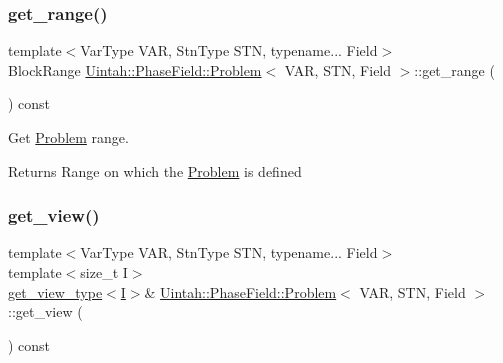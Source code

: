 \subsubsection{\texorpdfstring{get\+\_\+range()}{get\_range()}}
{\footnotesize\ttfamily template$<$Var\+Type V\+AR, Stn\+Type S\+TN, typename... Field$>$ \\
Block\+Range \hyperlink{classUintah_1_1PhaseField_1_1Problem}{Uintah\+::\+Phase\+Field\+::\+Problem}$<$ V\+AR, S\+TN, Field $>$\+::get\+\_\+range (\begin{DoxyParamCaption}{ }\end{DoxyParamCaption}) const\hspace{0.3cm}{\ttfamily [inline]}}



Get \hyperlink{classUintah_1_1PhaseField_1_1Problem}{Problem} range. 

\begin{DoxyReturn}{Returns}
Range on which the \hyperlink{classUintah_1_1PhaseField_1_1Problem}{Problem} is defined 
\end{DoxyReturn}
\mbox{\label{classUintah_1_1PhaseField_1_1Problem_ae68b96eca7d1f30b9cac99498a110de1}} 
\subsubsection{\texorpdfstring{get\+\_\+view()}{get\_view()}\hspace{0.1cm}{\footnotesize\ttfamily [1/4]}}
{\footnotesize\ttfamily template$<$Var\+Type V\+AR, Stn\+Type S\+TN, typename... Field$>$ \\
template$<$size\+\_\+t I$>$ \\
\hyperlink{classUintah_1_1PhaseField_1_1Problem_a53d941e785f501dddb8c369644eae4fa}{get\+\_\+view\+\_\+type}$<$\hyperlink{structUintah_1_1PhaseField_1_1I}{I}$>$\& \hyperlink{classUintah_1_1PhaseField_1_1Problem}{Uintah\+::\+Phase\+Field\+::\+Problem}$<$ V\+AR, S\+TN, Field $>$\+::get\+\_\+view (\begin{DoxyParamCaption}{ }\end{DoxyParamCaption}) const\hspace{0.3cm}{\ttfamily [inline]}}



